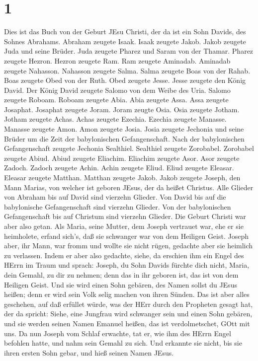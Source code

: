 \hypertarget{section}{%
\section{1}\label{section}}

 Dies ist das Buch von der Geburt JEsu Christi, der da ist
ein Sohn Davids, des Sohnes Abrahams.  Abraham zeugete
Isaak. Isaak zeugete Jakob. Jakob zeugete Juda und seine Brüder.
 Juda zeugete Pharez und Saram von der Thamar. Pharez
zeugete Hezron. Hezron zeugete Ram.  Ram zeugete Aminadab.
Aminadab zeugete Nahasson. Nahasson zeugete Salma.  Salma
zeugete Boas von der Rahab. Boas zeugete Obed von der Ruth. Obed zeugete
Jesse.  Jesse zeugete den König David. Der König David
zeugete Salomo von dem Weibe des Uria.  Salomo zeugete
Roboam. Roboam zeugete Abia. Abia zeugete Assa.  Assa
zeugete Josaphat. Josaphat zeugete Joram. Joram zeugte Osia.
 Osia zeugete Jotham. Jotham zeugete Achas. Achas zeugete
Ezechia.  Ezechia zeugete Manasse. Manasse zeugete Amon.
Amon zeugete Josia.  Josia zeugete Jechonia und seine
Brüder um die Zeit der babylonischen Gefangenschaft.  Nach
der babylonischen Gefangenschaft zeugete Jechonia Sealthiel. Sealthiel
zeugete Zorobabel.  Zorobabel zeugete Abiud. Abiud zeugete
Eliachim. Eliachim zeugete Asor.  Asor zeugete Zadoch.
Zadoch zeugete Achin. Achin zeugete Eliud.  Eliud zeugete
Eleasar. Eleasar zeugete Matthan. Matthan zeugete Jakob. 
Jakob zeugete Joseph, den Mann Marias, von welcher ist geboren JEsus,
der da heißet Christus.  Alle Glieder von Abraham bis auf
David sind vierzehn Glieder. Von David bis auf die babylonische
Gefangenschaft sind vierzehn Glieder. Von der babylonischen
Gefangenschaft bis auf Christum sind vierzehn Glieder.  Die
Geburt Christi war aber also getan. Als Maria, seine Mutter, dem Joseph
vertrauet war, ehe er sie heimholete, erfand sich's, daß sie schwanger
war von dem Heiligen Geist.  Joseph aber, ihr Mann, war
fromm und wollte sie nicht rügen, gedachte aber sie heimlich zu
verlassen.  Indem er aber also gedachte, siehe, da erschien
ihm ein Engel des HErrn im Traum und sprach: Joseph, du Sohn Davids
fürchte dich nicht, Maria, dein Gemahl, zu dir zu nehmen; denn das in
ihr geboren ist, das ist von dem Heiligen Geist.  Und sie
wird einen Sohn gebären, des Namen sollst du JEsus heißen; denn er wird
sein Volk selig machen von ihren Sünden.  Das ist aber
alles geschehen, auf daß erfüllet würde, was der HErr durch den
Propheten gesagt hat, der da spricht:  Siehe, eine Jungfrau
wird schwanger sein und einen Sohn gebären, und sie werden seinen Namen
Emanuel heißen, das ist verdolmetschet, GOtt mit uns.  Da
nun Joseph vom Schlaf erwachte, tat er, wie ihm des HErrn Engel befohlen
hatte, und nahm sein Gemahl zu sich.  Und erkannte sie
nicht, bis sie ihren ersten Sohn gebar, und hieß seinen Namen JEsus.

